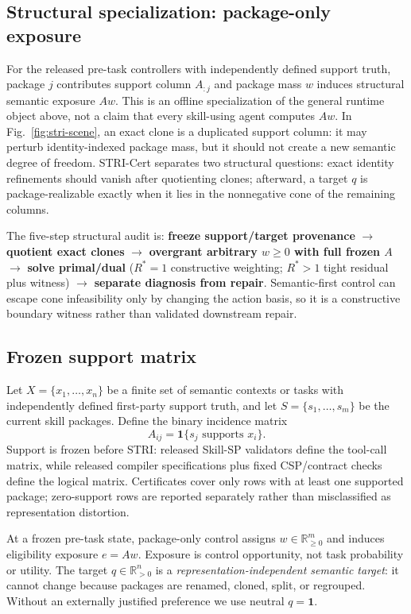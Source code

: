 \subsection{Structural specialization: package-only exposure}
For the released pre-task controllers with independently defined support truth, package $j$ contributes support column $A_{:j}$ and package mass $w$ induces structural semantic exposure $Aw$. This is an offline specialization of the general runtime object above, not a claim that every skill-using agent computes $Aw$. In Fig.~\ref{fig:stri-scene}, an exact clone is a duplicated support column: it may perturb identity-indexed package mass, but it should not create a new semantic degree of freedom. STRI-Cert separates two structural questions: exact identity refinements should vanish after quotienting clones; afterward, a target $q$ is package-realizable exactly when it lies in the nonnegative cone of the remaining columns.

The five-step structural audit is: \textbf{freeze support/target provenance} $\rightarrow$ \textbf{quotient exact clones} $\rightarrow$ \textbf{overgrant arbitrary $w\ge0$ with full frozen $A$} $\rightarrow$ \textbf{solve primal/dual} ($R^*=1$ constructive weighting; $R^*>1$ tight residual plus witness) $\rightarrow$ \textbf{separate diagnosis from repair}. Semantic-first control can escape cone infeasibility only by changing the action basis, so it is a constructive boundary witness rather than validated downstream repair.

\subsection{Frozen support matrix}
Let $X=\{x_1,\ldots,x_n\}$ be a finite set of semantic contexts or tasks with independently defined first-party support truth, and let $S=\{s_1,\ldots,s_m\}$ be the current skill packages. Define the binary incidence matrix
\[
A_{ij}=\mathbf{1}\{s_j\text{ supports }x_i\}.
\]
Support is frozen before STRI: released Skill-SP validators define the tool-call matrix, while released compiler specifications plus fixed CSP/contract checks define the logical matrix. Certificates cover only rows with at least one supported package; zero-support rows are reported separately rather than misclassified as representation distortion.

At a frozen pre-task state, package-only control assigns $w\in\mathbb{R}^m_{\ge0}$ and induces eligibility exposure $e=Aw$. Exposure is control opportunity, not task probability or utility. The target $q\in\mathbb{R}^n_{>0}$ is a \emph{representation-independent semantic target}: it cannot change because packages are renamed, cloned, split, or regrouped. Without an externally justified preference we use neutral $q=\mathbf1$.

